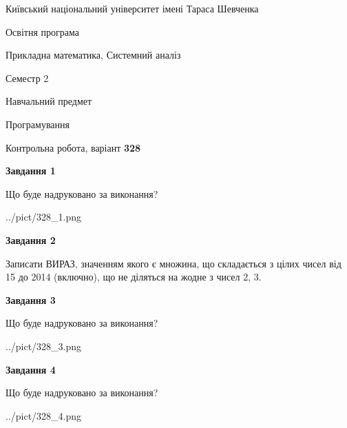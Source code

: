 \documentclass[12pt, ukrainian]{article}
\begin{document}
{{\begin {small}\par
{ \center  Київський національний університет імені Тараса Шевченка \par}
{\parbox {5 cm}{Освітня програма \hfill}{\parbox {8 cm}{Прикладна математика, Системний аналіз \hfill}}\parbox {5 cm}{\hfill Семестр 2}}\par
{\parbox {5 cm} {Навчальний предмет \hfill}\parbox {7 cm}{Програмування \hfill}\parbox {6cm}{\hfill}\par}\vspace{-7pt} \end{small}}{\center Контрольна робота, варіант  \No \textbf
{ 328 }\par}}
{
\begin {large}
{\begin {center}\textbf{Завдання 1}\end {center}}\par
Що буде надруковано за виконання?\par\par
\begin{center}
	{../pict/328_1.png}
\end{center}
\newpage

{\begin {center}\textbf{Завдання 2}\end {center}}\par
Записати ВИРАЗ, значенням якого є множина, що складається з цілих чисел від 15 до 2014 (включно), що не діляться на жодне з чисел 2, 3.\par
\newpage

{\begin {center}\textbf{Завдання 3}\end {center}}\par
Що буде надруковано за виконання?\par
\begin{center}
	{../pict/328_3.png}
\end{center}
\newpage

{\begin {center}\textbf{Завдання 4}\end {center}}\par
Що буде надруковано за виконання?\par
\begin{center}
	{../pict/328_4.png}
\end{center}
\newpage


\end{large}}
\end{document}
